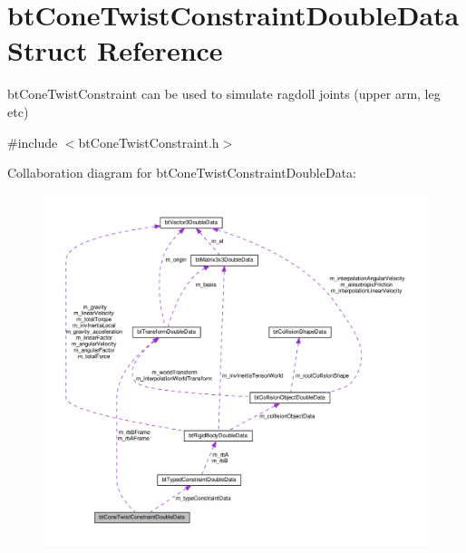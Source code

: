 \hypertarget{structbtConeTwistConstraintDoubleData}{}\section{bt\+Cone\+Twist\+Constraint\+Double\+Data Struct Reference}
\label{structbtConeTwistConstraintDoubleData}


bt\+Cone\+Twist\+Constraint can be used to simulate ragdoll joints (upper arm, leg etc)  




{\ttfamily \#include $<$bt\+Cone\+Twist\+Constraint.\+h$>$}



Collaboration diagram for bt\+Cone\+Twist\+Constraint\+Double\+Data\+:
\nopagebreak
\begin{figure}[H]
\begin{center}
\leavevmode
\includegraphics[width=350pt]{structbtConeTwistConstraintDoubleData__coll__graph}
\end{center}
\end{figure}
